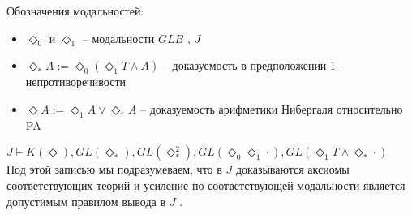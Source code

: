 \documentclass[12pt,a4paper,oneside]{article}
\begin{document}
  Обозначения модальностей:
  \begin{itemize}
    \item $\Diamond_0 $ и $\Diamond_1 $ -- модальности $GLB$ , $J$
    \item $\Diamond_* A := \Diamond_0 (\Diamond_1 T \wedge  A)$
          -- доказуемость в предположении 1-непротиворечивости
    \item $\Diamond A := \Diamond_1 A \vee  \Diamond_* A$
          -- доказуемость арифметики Нибергаля относительно PA
  \end{itemize}
  
  \begin{lemma}
    $J \vdash  K(\Diamond ), GL(\Diamond_* ), GL(\Diamond_* ^2), GL(\Diamond_0 \Diamond_1 \cdot),
     GL(\Diamond_1 T \wedge  \Diamond_* \cdot)$
    \\
    Под этой записью мы подразумеваем, что в $J$
    доказываются аксиомы соответствующих теорий
    и усиление по соответствующей модальности является
    допустимым правилом вывода в
    $J$ .
  \end{lemma}
\end{document}
